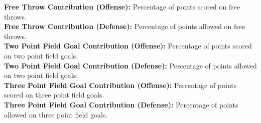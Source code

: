 \documentclass[letterpaper,12pt]{article}
\begin{document}
\textbf{Free Throw Contribution (Offense):} Percentage of points scored on free throws.\\
\textbf{Free Throw Contribution (Defense):} Percentage of points allowed on free throws.\\
\textbf{Two Point Field Goal Contribution (Offense):} Percentage of points scored on two point field goals.\\
\textbf{Two Point Field Goal Contribution (Defense):} Percentage of points allowed on two point field goals.\\
\textbf{Three Point Field Goal Contribution (Offense):} Percentage of points scored on three point field goals.\\
\textbf{Three Point Field Goal Contribution (Defense):} Percentage of points allowed on three point field goals.\\
\normalsize







\end{document}
